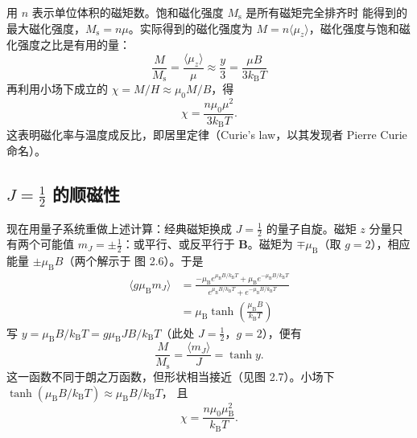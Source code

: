 用 $n$ 表示单位体积的磁矩数。饱和磁化强度 $M_{\mathrm{s}}$ 是所有磁矩完全排齐时
能得到的最大磁化强度，$M_{\mathrm{s}}=n\mu$。实际得到的磁化强度为
$M=n\langle\mu_z\rangle$，磁化强度与饱和磁化强度之比是有用的量：
\begin{equation*}
\frac{M}{M_{\mathrm{s}}} = \frac{\langle\mu_z\rangle}{\mu} \approx \frac{y}{3} = \frac{\mu B}{3k_{\mathrm{B}}T}\tag{2.23}
\end{equation*}
再利用小场下成立的 $\chi=M/H\approx\mu_0M/B$，得
\begin{equation*}
\chi = \frac{n\mu_0\mu^{2}}{3k_{\mathrm{B}}T}.\tag{2.24}
\end{equation*}
这表明磁化率与温度成反比，即居里定律（Curie's law，以其发现者 Pierre Curie 命名）。

\subsection{$J=\frac{1}{2}$ 的顺磁性}

现在用量子系统重做上述计算：经典磁矩换成 $J=\frac{1}{2}$ 的量子自旋。磁矩 $z$
分量只有两个可能值 $m_J=\pm\frac{1}{2}$：或平行、或反平行于 $\mathbf{B}$。磁矩为
$\mp\mu_{\mathrm{B}}$（取 $g=2$），相应能量 $\pm\mu_{\mathrm{B}}B$（两个解示于
图 2.6）。于是
\begin{align*}
\langle g\mu_{\mathrm{B}}m_J\rangle &= \frac{-\mu_{\mathrm{B}}e^{\mu_{\mathrm{B}}B/k_{\mathrm{B}}T}+\mu_{\mathrm{B}}e^{-\mu_{\mathrm{B}}B/k_{\mathrm{B}}T}}{e^{\mu_{\mathrm{B}}B/k_{\mathrm{B}}T}+e^{-\mu_{\mathrm{B}}B/k_{\mathrm{B}}T}}\tag{2.25}\\
&= \mu_{\mathrm{B}}\tanh\left(\frac{\mu_{\mathrm{B}}B}{k_{\mathrm{B}}T}\right)\tag{2.26}
\end{align*}
写 $y=\mu_{\mathrm{B}}B/k_{\mathrm{B}}T=g\mu_{\mathrm{B}}JB/k_{\mathrm{B}}T$（此处
$J=\frac{1}{2}$，$g=2$），便有
\begin{equation*}
\frac{M}{M_{\mathrm{s}}} = \frac{\langle m_J\rangle}{J} = \tanh y.\tag{2.27}
\end{equation*}
这一函数不同于朗之万函数，但形状相当接近（见图 2.7）。小场下
$\tanh(\mu_{\mathrm{B}}B/k_{\mathrm{B}}T)\approx\mu_{\mathrm{B}}B/k_{\mathrm{B}}T$，
且
\begin{equation*}
\chi = \frac{n\mu_0\mu_{\mathrm{B}}^{2}}{k_{\mathrm{B}}T}.\tag{2.28}
\end{equation*}

